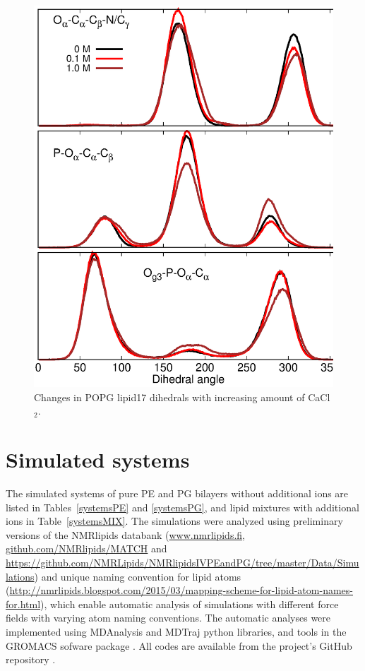 \documentclass[journal=jpcbfk]{achemso}
\begin{document}
\begin{figure}[]
  \centering
  \includegraphics[width=16.0cm]{./Figs/DIHEDRALSlipid17WITHCaClPOPG.eps}
  \caption{\label{DIHSwithCAlipid17POPG}
    Changes in POPG lipid17 dihedrals with increasing amount of CaCl$_2$.
  }
\end{figure}


\clearpage
\section{Simulated systems}

The simulated systems of pure PE and PG bilayers without additional ions
are listed in Tables~\ref{systemsPE} and \ref{systemsPG},
and lipid mixtures with additional ions in Table~\ref{systemsMIX}.
The simulations were analyzed using preliminary versions of the NMRlipids databank
(\url{www.nmrlipids.fi}, \url{github.com/NMRlipids/MATCH} and \url{https://github.com/NMRLipids/NMRlipidsIVPEandPG/tree/master/Data/Simulations})
and unique naming convention for lipid atoms (\url{http://nmrlipids.blogspot.com/2015/03/mapping-scheme-for-lipid-atom-names-for.html}),
which enable automatic analysis of simulations with different force fields with varying atom naming conventions.
The automatic analyses were implemented using MDAnalysis \cite{agrawal11,gowers16} and MDTraj \cite{mcgibbon15}
python libraries, and tools in the GROMACS sofware package \cite{gromacsMANUAL}.
All codes are available from the project's GitHub repository \cite{NMRlipidsIVbgit}.
\end{document}
